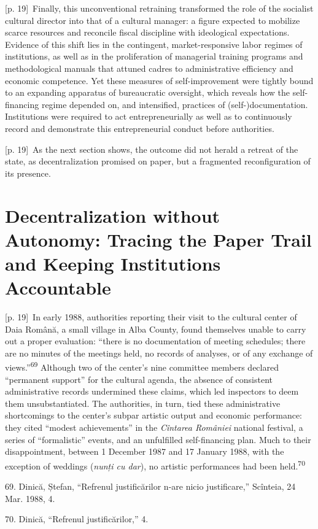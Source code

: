 \documentclass[10pt,a4paper]{article}
\begin{document}
{\scriptsize\color{gray} [p. 19]}\ Finally, this unconventional retraining transformed the role of the socialist cultural director into that of a cultural manager: a figure expected to mobilize scarce resources and reconcile fiscal discipline with ideological expectations. Evidence of this shift lies in the contingent, market-responsive labor regimes of institutions, as well as in the proliferation of managerial training programs and methodological manuals that attuned cadres to administrative efficiency and economic competence. Yet these measures of self-improvement were tightly bound to an expanding apparatus of bureaucratic oversight, which reveals how the self-financing regime depended on, and intensified, practices of (self-)documentation. Institutions were required to act entrepreneurially as well as to continuously record and demonstrate this entrepreneurial conduct before authorities.\par
{\scriptsize\color{gray} [p. 19]}\ As the next section shows, the outcome did not herald a retreat of the state, as decentralization promised on paper, but a fragmented reconfiguration of its presence.\par
{}\section*{Decentralization without Autonomy: Tracing the Paper Trail and Keeping Institutions Accountable}
{\scriptsize\color{gray} [p. 19]}\ In early 1988, authorities reporting their visit to the cultural center of Daia Română, a small village in Alba County, found themselves unable to carry out a proper evaluation: “there is no documentation of meeting schedules; there are no minutes of the meetings held, no records of analyses, or of any exchange of views.”\nobreak\textsuperscript{69} Although two of the center’s nine committee members declared “permanent support” for the cultural agenda, the absence of consistent administrative records undermined these claims, which led inspectors to deem them unsubstantiated. The authorities, in turn, tied these administrative shortcomings to the center’s subpar artistic output and economic performance: they cited “modest achievements” in the \textit{Cîntarea României} national festival, a series of “formalistic” events, and an unfulfilled self-financing plan. Much to their disappointment, between 1 December 1987 and 17 January 1988, with the exception of weddings (\textit{nunți cu dar}), no artistic performances had been held.\nobreak\textsuperscript{70}\par{\small 69. Dinică, Ștefan, “Refrenul justificărilor n-are nicio justificare,” Scînteia, 24 Mar. 1988, 4.\par}{\small 70. Dinică, “Refrenul justificărilor,” 4.\par}
\end{document}
